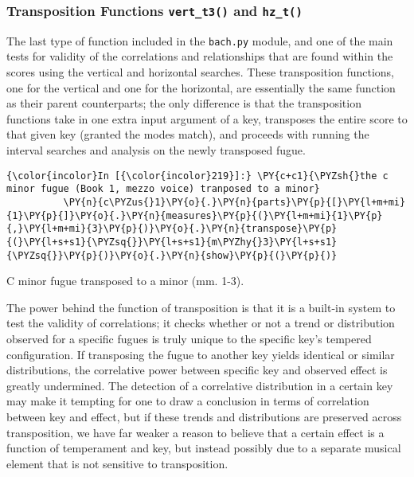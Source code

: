 \subsubsection{\texorpdfstring{Transposition Functions
\texttt{vert\_t3()} and
\texttt{hz\_t()}}{Transposition Functions vert\_t3() and hz\_t()}}\label{transposition-functions-vert_t3-and-hz_t}

The last type of function included in the \texttt{bach.py} module, and
one of the main tests for validity of the correlations and relationships
that are found within the scores using the vertical and horizontal
searches. These transposition functions, one for the vertical and one
for the horizontal, are essentially the same function as their parent
counterparts; the only difference is that the transposition functions
take in one extra input argument of a key, transposes the entire score
to that given key (granted the modes match), and proceeds with running
the interval searches and analysis on the newly transposed fugue.


    \begin{Verbatim}[commandchars=\\\{\}]
{\color{incolor}In [{\color{incolor}219}]:} \PY{c+c1}{\PYZsh{}the c minor fugue (Book 1, mezzo voice) tranposed to a minor}
          \PY{n}{c\PYZus{}1}\PY{o}{.}\PY{n}{parts}\PY{p}{[}\PY{l+m+mi}{1}\PY{p}{]}\PY{o}{.}\PY{n}{measures}\PY{p}{(}\PY{l+m+mi}{1}\PY{p}{,}\PY{l+m+mi}{3}\PY{p}{)}\PY{o}{.}\PY{n}{transpose}\PY{p}{(}\PY{l+s+s1}{\PYZsq{}}\PY{l+s+s1}{m\PYZhy{}3}\PY{l+s+s1}{\PYZsq{}}\PY{p}{)}\PY{o}{.}\PY{n}{show}\PY{p}{(}\PY{p}{)}
\end{Verbatim}

\begin{Example}[H]
\vspace{1.5em}
    \centering
    \caption{ C minor fugue transposed to a minor (mm. 1-3). }
\end{Example}    
    The power behind the function of transposition is that it is a built-in
system to test the validity of correlations; it checks whether or not a
trend or distribution observed for a specific fugues is truly unique to
the specific key's tempered configuration. If transposing the fugue to
another key yields identical or similar distributions, the correlative
power between specific key and observed effect is greatly undermined.
The detection of a correlative distribution in a certain key may make it
tempting for one to draw a conclusion in terms of correlation between
key and effect, but if these trends and distributions are preserved
across transposition, we have far weaker a reason to believe that a
certain effect is a function of temperament and key, but instead
possibly due to a separate musical element that is not sensitive to
transposition.

